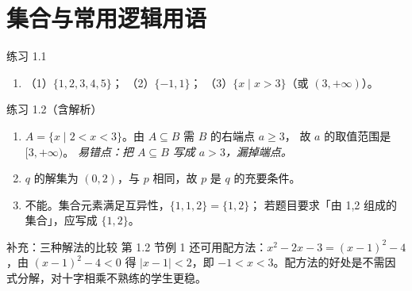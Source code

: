 \section{集合与常用逻辑用语}

\begin{ansblock}{练习 1.1}
\begin{enumerate}
  \item （1）$\{1,2,3,4,5\}$；
  （2）$\{-1,1\}$；
  （3）$\{x\mid x>3\}$（或 $(3,+\infty)$）。
\end{enumerate}
\end{ansblock}

\begin{ansblock}{练习 1.2（含解析）}
\begin{enumerate}
  \item $A=\{x\mid 2<x<3\}$。由 $A\subseteq B$ 需 $B$ 的右端点 $a\ge 3$，
        故 $a$ 的取值范围是 $[3,+\infty)$。
        \quad\textit{易错点：把 $A\subseteq B$ 写成 $a>3$，漏掉端点。}
  \item $q$ 的解集为 $(0,2)$，与 $p$ 相同，故 $p$ 是 $q$ 的充要条件。
  \item 不能。集合元素满足互异性，$\{1,1,2\}=\{1,2\}$；
        若题目要求「由 1,2 组成的集合」，应写成 $\{1,2\}$。
\end{enumerate}
\end{ansblock}

\begin{ansblock}{补充：三种解法的比较}
第 1.2 节例 1 还可用配方法：$x^2-2x-3=(x-1)^2-4$，由 $(x-1)^2-4<0$ 得
$|x-1|<2$，即 $-1<x<3$。配方法的好处是不需因式分解，对十字相乘不熟练的学生更稳。
\end{ansblock}
